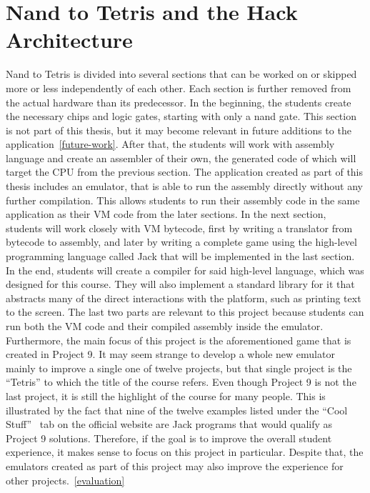 \section{Nand to Tetris and the Hack Architecture}
Nand to Tetris is divided into several sections that can be worked on or skipped more or less independently of each other.
Each section is further removed from the actual hardware than its predecessor. In the beginning, the students create the necessary chips and logic gates, starting with only a nand gate. This section is not part of this thesis, but it may become relevant in future additions to the application~\ref{future-work}.
After that, the students will work with assembly language and create an assembler of their own, the generated code of which will target the CPU from the previous section.
The application created as part of this thesis includes an emulator, that is able to run the assembly directly without any further compilation. This allows students to run their assembly code in the same application as their VM code from the later sections.
In the next section, students will work closely with VM bytecode, first by writing a translator from bytecode to assembly, and later by writing a complete game using the high-level programming language called Jack that will be implemented in the last section.
In the end, students will create a compiler for said high-level language, which was designed for this course. They will also implement a standard library for it that abstracts many of the direct interactions with the platform, such as printing text to the screen.
The last two parts are relevant to this project because students can run both the VM code and their compiled assembly inside the emulator. Furthermore, the main focus of this project is the aforementioned game that is created in Project 9.
It may seem strange to develop a whole new emulator mainly to improve a single one of twelve projects, but that single project is the ``Tetris'' to which the title of the course refers. Even though Project 9 is not the last project, it is still the highlight of the course for many people.
This is illustrated by the fact that nine of the twelve examples listed under the ``Cool Stuff''~\cite{n2tweb} tab on the official website are Jack programs that would qualify as Project 9 solutions.
Therefore, if the goal is to improve the overall student experience, it makes sense to focus on this project in particular.
Despite that, the emulators created as part of this project may also improve the experience for other projects.~\ref{evaluation}

